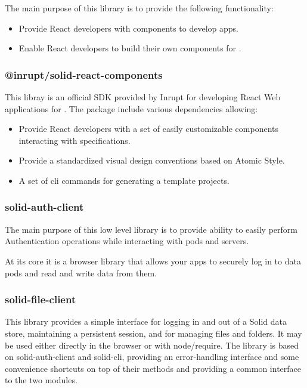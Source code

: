The main purpose of this library is to provide the following functionality:

\begin{itemize}
	\item Provide React developers with components to develop \solid{} apps.
    \item Enable React developers to build their own components for \solid{}.
\end{itemize}

\subsubsection{@inrupt/solid-react-components}

This libray is an official SDK provided by Inrupt for developing React Web applications for \solid{}. The package include various dependencies allowing:

\begin{itemize}
	\item Provide React developers with a set of easily customizable components interacting with \solid{} specifications.
    \item Provide a standardized visual design conventions based on Atomic Style.
    \item A set of cli commands for generating a template \solid{} projects.
\end{itemize}

\subsubsection{solid-auth-client}

The main purpose of this low level library is to provide ability to easily perform Authentication operations while interacting with \solid{} pods and servers.

At its core it is a browser library that allows your apps to securely log in to \solid{} data pods and read and write data from them.

\subsubsection{solid-file-client}

This library provides a simple interface for logging in and out of a Solid data store, maintaining a persistent session, and for managing files and folders. It may be used either directly in the browser or with node/require. The library is based on solid-auth-client and solid-cli, providing an error-handling interface and some convenience shortcuts on top of their methods and providing a common interface to the two modules.


